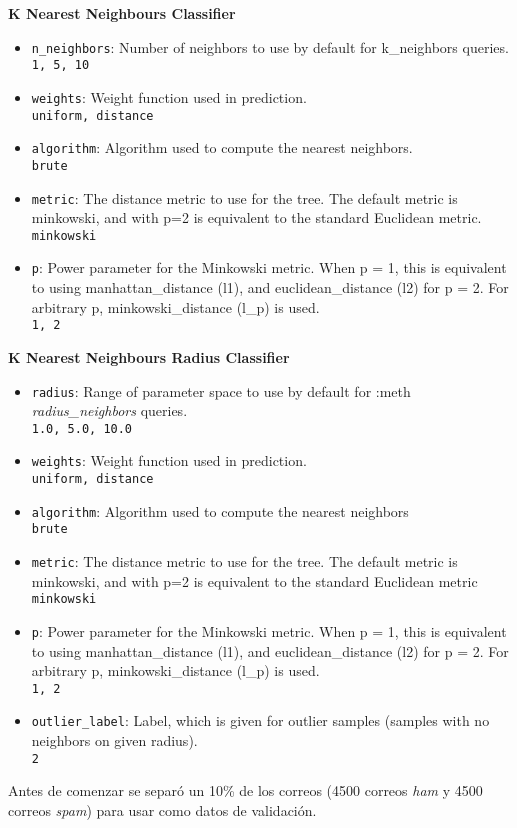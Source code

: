 \noindent \textbf{K Nearest Neighbours Classifier}
\begin{itemize}
  \item \texttt{n\_neighbors}: Number of neighbors to use by default for k\_neighbors queries.\\
  \texttt{1, 5, 10}
  \item \texttt{weights}: Weight function used in prediction.\\
  \texttt{uniform, distance}
  \item \texttt{algorithm}: Algorithm used to compute the nearest neighbors.\\
  \texttt{brute}
  \item \texttt{metric}: The distance metric to use for the tree. The default metric is minkowski, and with p=2 is equivalent to the standard Euclidean metric.\\
  \texttt{minkowski}
  \item \texttt{p}: Power parameter for the Minkowski metric. When p = 1, this is equivalent to using manhattan\_distance (l1), and euclidean\_distance (l2) for p = 2. For arbitrary p, minkowski\_distance (l\_p) is used.\\
  \texttt{1, 2}
\end{itemize}

\noindent \textbf{K Nearest Neighbours Radius Classifier}
\begin{itemize}
  \item \texttt{radius}: Range of parameter space to use by default for :meth \emph{radius\_neighbors} queries.\\
  \texttt{1.0, 5.0, 10.0}
  \item \texttt{weights}: Weight function used in prediction.\\
  \texttt{uniform, distance}
  \item \texttt{algorithm}: Algorithm used to compute the nearest neighbors\\
  \texttt{brute}
  \item \texttt{metric}: The distance metric to use for the tree. The default metric is minkowski, and with p=2 is equivalent to the standard Euclidean metric\\
  \texttt{minkowski}
  \item \texttt{p}: Power parameter for the Minkowski metric. When p = 1, this is equivalent to using manhattan\_distance (l1), and euclidean\_distance (l2) for p = 2. For arbitrary p, minkowski\_distance (l\_p) is used.\\
  \texttt{1, 2}
  \item \texttt{outlier\_label}: Label, which is given for outlier samples (samples with no neighbors on given radius).\\
  \texttt{2}
\end{itemize}

\noindent Antes de comenzar se separó un 10\% de los correos (4500 correos \emph{ham} y 4500 correos \emph{spam}) para usar como datos de validación.

